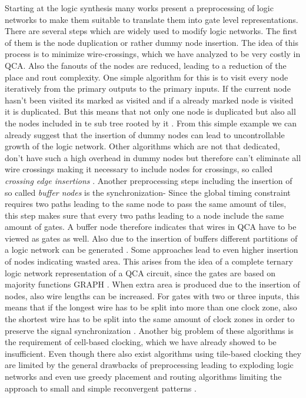Starting at the logic synthesis many works present a preprocessing of logic networks to make them suitable to translate them into gate level representations. There are several steps which are widely used to modify logic networks. The first of them is the node duplication or rather dummy node insertion. The idea of this process is to minimize wire-crossings, which we have analyzed to be very costly in QCA. Also the fanouts of the nodes are reduced, leading to a reduction of the place and rout complexity. One simple algorithm for this is to visit every node iteratively from the primary outputs to the primary inputs. If the current node hasn't been visited its marked as visited and if a already marked node is visited it is duplicated. But this means that not only one node is duplicated but also all the nodes included in te sub tree rooted by it \cite{QCA-LG}. From this simple example we can already suggest that the insertion of dummy nodes can lead to uncontrollable growth of the logic network. Other algorithms which are not that dedicated, don't have such a high overhead in dummy nodes but therefore can't eliminate all wire crossings making it necessary to include nodes for crossings, so called \textit{crossing edge insertions} \cite{node_duplication}. Another preprocessing steps including the insertion of so called \textit{buffer nodes} is the synchronization- Since the global timing constraint requires two paths leading to the same node to pass the same amount of tiles, this step makes sure that every two paths leading to a node include the same amount of gates. A buffer node therefore indicates that wires in QCA have to be viewed as gates as well. Also due to the insertion of buffers different partitions of a logic network can be generated \cite{dummy_and_buffer_nodes}. Some approaches lead to even higher insertion of nodes indicating wasted area. This arises from the idea of a complete ternary logic network representation of a QCA circuit, since the gates are based on majority functions GRAPH . When extra area is produced due to the insertion of nodes, also wire lengths can be increased. For gates with two or three inputs, this means that if the longest wire has to be split into more than one clock zone, also the shortest wire has to be split into the same amount of clock zones in order to preserve the signal synchronization \cite{QCA-LG}. Another big problem of these algorithms is the requirement of cell-based clocking, which we have already showed to be insufficient. Even though there also exist algorithms using tile-based clocking they are limited by the general drawbacks of preprocessing \cite{trindade2016placement} leading to exploding logic networks and even use greedy placement and routing algorithms limiting the approach to small and simple reconvergent patterns \cite{greedy_tile}.\\

